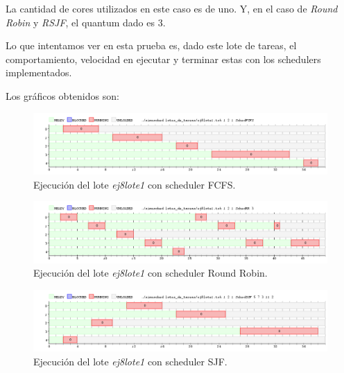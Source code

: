 La cantidad de cores utilizados en este caso es de uno. Y, en el caso de \emph{Round Robin} y \emph{RSJF}, el quantum dado es 3.

Lo que intentamos ver en esta prueba es, dado este lote de tareas, el comportamiento, velocidad en ejecutar y terminar estas con los schedulers implementados.

Los gráficos obtenidos son:

\begin{figure}[!h]
	\begin{center}
		\includegraphics[width=500px]{imagenes/ej8_prueba1_fcfs.png}
		\caption{Ejecución del lote \emph{ej8lote1} con scheduler FCFS.}
		\label{fig:grafico_ej8_prueba1_fcfs}
	\end{center}
\end{figure}

\begin{figure}[!h]
	\begin{center}
		\includegraphics[width=500px]{imagenes/ej8_prueba1_rr.png}
		\caption{Ejecución del lote \emph{ej8lote1} con scheduler Round Robin.}
		\label{fig:grafico_ej8_prueba1_rr}
	\end{center}
\end{figure}

\begin{figure}[!h]
	\begin{center}
		\includegraphics[width=500px]{imagenes/ej8_prueba1_sjf.png}
		\caption{Ejecución del lote \emph{ej8lote1} con scheduler SJF.}
		\label{fig:grafico_ej8_prueba1_sjf}
	\end{center}
\end{figure}

